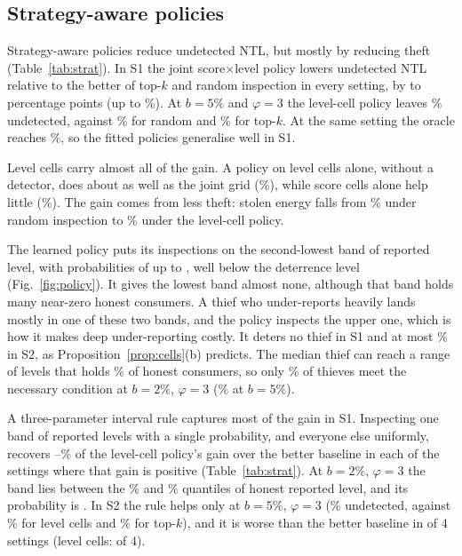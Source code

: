 \documentclass[journal]{IEEEtran}
\begin{document}
\subsection{Strategy-aware policies}\label{sec:res-strat}
Strategy-aware policies reduce undetected NTL, but mostly by reducing theft (Table~\ref{tab:strat}). In S1 the joint score$\times$level policy lowers undetected NTL relative to the better of top-$k$ and random inspection in every setting, by \rSeGainMinSOne{} to \rSeGainMaxSOne{} percentage points (up to \rSeGainRelMaxSOne\%). At $b=5\%$ and $\varphi=3$ the level-cell policy leaves \rSeSOneBFivePThreeLevel\% undetected, against \rSeSOneBFivePThreeRand\% for random and \rSeSOneBFivePThreeTopk\% for top-$k$. At the same setting the oracle reaches \rSeSOneBFivePThreeOracle\%, so the fitted policies generalise well in S1.

Level cells carry almost all of the gain. A policy on level cells alone, without a detector, does about as well as the joint grid (\rSeSOneBFivePThreeJoint\%), while score cells alone help little (\rSeSOneBFivePThreeScore\%). The gain comes from less theft: stolen energy falls from \rSeStSOneBFivePThreeRand\% under random inspection to \rSeStSOneBFivePThreeLevel\% under the level-cell policy.

The learned policy puts its inspections on the second-lowest band of reported level, with probabilities of up to \rPolicyMaxP{}, well below the deterrence level \rPolicyDetLevel{} (Fig.~\ref{fig:policy}). It gives the lowest band almost none, although that band holds many near-zero honest consumers. A thief who under-reports heavily lands mostly in one of these two bands, and the policy inspects the upper one, which is how it makes deep under-reporting costly. It deters no thief in S1 and at most \rSeDeterMaxSTwo\% in S2, as Proposition~\ref{prop:cells}(b) predicts. The median thief can reach a range of levels that holds \rFeasMedianM\% of honest consumers, so only \rFeasTwoThree\% of thieves meet the necessary condition at $b=2\%$, $\varphi=3$ (\rFeasFiveThree\% at $b=5\%$).

A three-parameter interval rule captures most of the gain in S1. Inspecting one band of reported levels with a single probability, and everyone else uniformly, recovers \rIvShareMinSOne--\rIvShareMaxSOne\% of the level-cell policy's gain over the better baseline in each of the \rIvShareNSOne{} settings where that gain is positive (Table~\ref{tab:strat}). At $b=2\%$, $\varphi=3$ the band lies between the \rIvPctLoSOne\% and \rIvPctHiSOne\% quantiles of honest reported level, and its probability is \rIvPSOne{}. In S2 the rule helps only at $b=5\%$, $\varphi=3$ (\rSeSTwoBFivePThreeInterval\% undetected, against \rSeSTwoBFivePThreeLevel\% for level cells and \rSeSTwoBFivePThreeTopk\% for top-$k$), and it is worse than the better baseline in \rIvWorseThanBaseSTwo{} of 4 settings (level cells: \rLvWorseThanBaseSTwo{} of 4).
\end{document}
